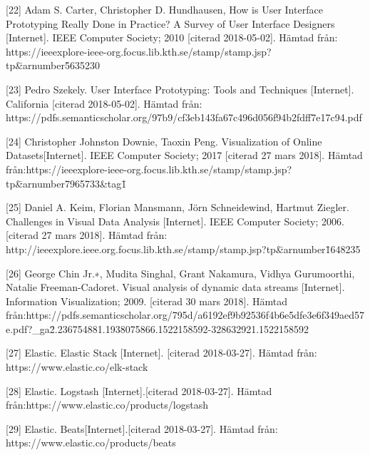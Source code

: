 \documentclass[12pt]{kththesis}
\begin{document}
[22] Adam S. Carter, Christopher D. Hundhausen, How is User Interface Prototyping Really Done in Practice? A Survey of User Interface Designers [Internet]. IEEE Computer Society; 2010 [citerad 2018-05-02]. Hämtad från: https://ieeexplore-ieee-org.focus.lib.kth.se/stamp/stamp.jsp?tp\=\&arnumber\newline\=5635230

[23] Pedro Szekely. User Interface Prototyping: Tools and Techniques [Internet]. California [citerad 2018-05-02]. Hämtad från: \newline https://pdfs.semanticscholar.org/97b9\newline/cf3eb143fa67c496d056f94b2fdff7e17c94.pdf  

[24] Christopher Johnston Downie, Taoxin Peng. Visualization of Online Datasets[Internet].  IEEE Computer Society; 2017 [citerad 27 mars 2018]. Hämtad från:\newline https://ieeexplore-ieee-org.focus.lib.kth.se/stamp/stamp.jsp?tp\=\&arnumber\newline\=7965733\&tag\=1

[25] Daniel A. Keim, Florian Mansmann, Jörn Schneidewind, Hartmut Ziegler. Challenges in Visual Data Analysis [Internet]. IEEE Computer Society; 2006. [citerad 27 mars 2018]. Hämtad från:\newline
http://ieeexplore.ieee.org.focus.lib.kth.se/stamp/stamp.jsp?tp\=\&arnumber\newline\=1648235        
   
[26] George Chin Jr.∗, Mudita Singhal, Grant Nakamura, Vidhya Gurumoorthi, Natalie Freeman-Cadoret. Visual analysis of dynamic data streams [Internet]. Information Visualization; 2009. [citerad 30 mars 2018]. Hämtad från:\newline https://pdfs.semanticscholar.org/795d\newline/a6192ef9b92536f4b6e5dfe3e6f349aed57e.pdf?\_ga\newline\=2.236754881.1938075866.1522158592-328632921.1522158592
                   
[27] Elastic. Elastic Stack [Internet]. [citerad 2018-03-27]. Hämtad från:
https://www.elastic.co/elk-stack 

[28] Elastic. Logstash [Internet].[citerad 2018-03-27]. Hämtad från:\newline https://www.elastic.co/products/logstash

[29] Elastic. Beats[Internet].[citerad 2018-03-27]. Hämtad från: \newline https://www.elastic.co/products/beats
\end{document}
